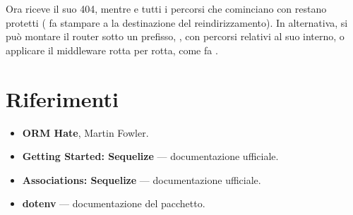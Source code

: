 Ora  riceve il suo 404, mentre  e tutti i percorsi
che cominciano con  restano protetti (
fa stampare a  la destinazione del reindirizzamento). In
alternativa, si può montare il router sotto un prefisso,
, con percorsi relativi al suo interno, o
applicare il middleware rotta per rotta, come fa .

\section{Riferimenti}

\begin{itemize}
  \item \textbf{ORM Hate}, Martin Fowler. \\
  \item \textbf{Getting Started: Sequelize} --- documentazione ufficiale. \\
  \item \textbf{Associations: Sequelize} --- documentazione ufficiale. \\
  \item \textbf{dotenv} --- documentazione del pacchetto. \\
\end{itemize}
